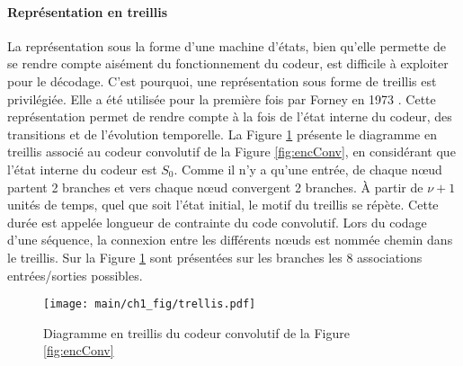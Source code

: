 \paragraph*{Représentation en treillis}
La représentation sous la forme d'une machine d'états, bien qu'elle permette de se rendre compte aisément du fonctionnement du 
codeur, est difficile à exploiter pour le décodage. C'est pourquoi, une représentation sous forme de treillis est privilégiée. Elle a
été utilisée pour la première fois par Forney en 1973 \cite{forney73viterbi}. Cette
représentation permet de rendre compte à la fois de l'état interne du codeur, des transitions et de l'évolution 
temporelle. La Figure \ref{fig:trellis} présente le diagramme en treillis associé au codeur convolutif de la Figure 
\ref{fig:encConv}, en considérant que l'état interne du codeur est $S_0$. Comme il n'y a qu'une entrée, de chaque nœud 
partent 2 branches et vers chaque nœud convergent 2 branches. À partir de $\nu+1$ unités de temps, quel que soit l'état 
initial, le motif du treillis se répète. Cette durée est appelée longueur de contrainte du code convolutif. Lors du 
codage d'une séquence, la connexion entre les différents nœuds est nommée chemin dans le treillis. Sur la Figure  
\ref{fig:trellis} sont présentées sur les branches les 8 associations entrées/sorties possibles.
\begin{figure}[!h]
	\centering
	\texttt{[image: main/ch1\_fig/trellis.pdf]}
	\caption{\label{fig:trellis} Diagramme en treillis du codeur convolutif de la Figure \ref{fig:encConv}}
\end{figure}

